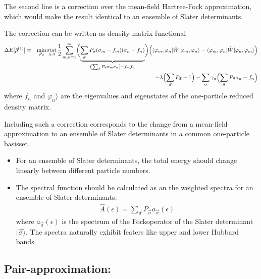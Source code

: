 \documentclass[11pt,a4paper]{report}
\begin{document}
The second line is a correction over the mean-field Hartree-Fock
approximation, which would make the result identical to an ensemble of
Slater determinants.

The correction can be written as density-matrix functional
\begin{eqnarray}
\Delta{E}[\hat{\rho}^{(1)}]&=&\min_{P_{\vec{\sigma}}}
\operatorname*{stat}_{\lambda,\vec{\gamma}}
\frac{1}{2}\sum_{m,n=1}^\infty
\biggl(\underbrace{
\sum_{\vec{\sigma}} P_{\vec{\sigma}}(\sigma_m-f_m)(\sigma_n-f_n)
}_{\left(\sum_{\vec{\sigma}} P_{\vec{\sigma}} \sigma_{m}\sigma_n\right)-f_mf_n}
\biggr)
\Bigl(\langle\varphi_m,\varphi_n|\hat{W}|\varphi_m,\varphi_n\rangle 
-\langle\varphi_m,\varphi_n|\hat{W}|\varphi_n,\varphi_m\rangle 
\Bigr)
\nonumber\\
&&-\lambda\Bigl(\sum_{\vec{\sigma}}P_{\vec{\sigma}}-1\Bigr)
-\sum_{\alpha}\gamma_n\Bigl(\sum_{\vec{\sigma}}P_{\vec{\sigma}}\sigma_n-f_n\Bigr)
\end{eqnarray}
where $f_n$ and $\varphi_n\rangle$ are the eigenvalues and eigenstates
of the one-particle reduced density matrix. 

Including such a correction corresponds to the change from a
mean-field approximation to an ensemble of Slater determinants in a
common one-particle basisset.
\begin{itemize}
\item For an ensemble of Slater determinants, the total energy should
  change linearly between different particle numbers.
%
\item The spectral function should be calculated as an the weighted
  spectra for an ensemble of Slater determinants.
  \begin{eqnarray}
    \hat{A}(\epsilon)=\sum_{\vec{\sigma}}P_{\vec{\sigma}} a_{\vec{\sigma}}(\epsilon)
  \end{eqnarray}
  where $a_{\vec{\sigma}}(\epsilon)$ is the spectrum of the
  Fockoperator of the Slater determinant $|\vec{\sigma}\rangle$. The
  spectra naturally exhibit featers like upper and lower Hubbard
  bands.
\end{itemize}



\subsection{Pair-approximation:} 
\end{document}
